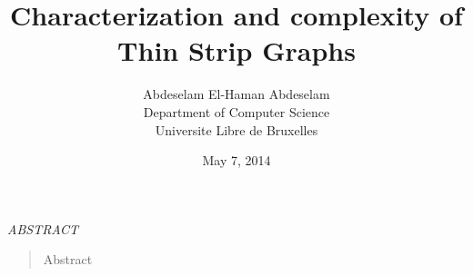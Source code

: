 \documentclass[12pt]{article}
\title{Characterization and complexity of Thin Strip Graphs}
\author{Abdeselam El-Haman Abdeselam \\  Department of Computer Science \\ Universite Libre de Bruxelles}
\date{May 7, 2014}
\begin{document}
  \maketitle




\begin{center} {\sl ABSTRACT} \end{center}

\begin{quotation}

Abstract

\end{quotation}







\end{document}
